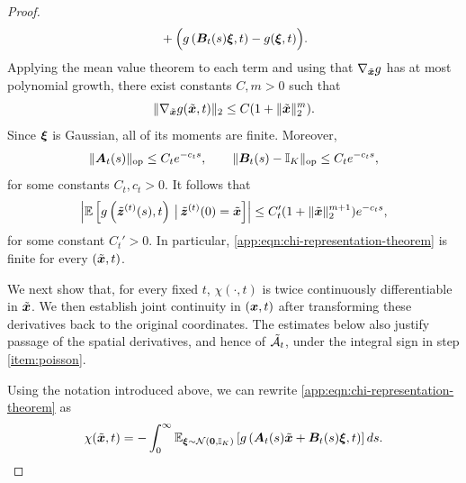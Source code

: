 \begin{proof}
\begin{equation*}
\begin{aligned}
    &\quad + \Big( g\left(\boldsymbol{B}_t(s)\boldsymbol{\xi},t\right)-g(\boldsymbol{\xi},t) \Big).
\end{aligned}
\end{equation*}
Applying the mean value theorem to each term and using that $\nabla_{\tilde{\boldsymbol{x}}} g$ has at most polynomial growth,
there exist constants $C, m > 0$ such that
\begin{equation*}
    \|\nabla_{\tilde{\boldsymbol{x}}} g(\tilde{\boldsymbol{x}},t)\|_2 \le C(1+\|\tilde{\boldsymbol{x}}\|_2^m).
\end{equation*}
Since $\boldsymbol{\xi}$ is Gaussian, all of its moments are finite. Moreover,
\begin{equation*}
    \|\boldsymbol{A}_t(s)\|_{\mathrm{op}} \leq C_t e^{-c_t s}, \qquad \|\boldsymbol{B}_t(s)-\mathbb{I}_K\|_{\mathrm{op}} \leq C_t e^{-c_t s},
\end{equation*}
for some constants $C_t, c_t > 0$. It follows that
\begin{equation*}
    \left| \mathbb{E}\left[g\left(\tilde{\boldsymbol{z}}^{(t)}(s),t\right)\,\big|\,\tilde{\boldsymbol{z}}^{(t)}(0)=\tilde{\boldsymbol{x}}\right] \right| \leq C_t'(1+\|\tilde{\boldsymbol{x}}\|_2^{m+1})e^{-c_t s},
\end{equation*}
for some constant $C_t' > 0$. In particular, \cref{app:eqn:chi-representation-theorem} is finite for every $(\tilde{\boldsymbol{x}}, t)$.

We next show that, for every fixed $t$, $\chi(\cdot,t)$ is twice continuously differentiable in $\tilde{\boldsymbol{x}}$. We then establish joint continuity in $(\boldsymbol{x},t)$ after transforming these derivatives back to the original coordinates. The estimates below also justify passage of the spatial derivatives, and hence of $\tilde{\mathcal{A}}_t$, under the integral sign in step \ref{item:poisson}.

Using the notation introduced above, we can rewrite
\cref{app:eqn:chi-representation-theorem} as
\begin{equation}\label{app:eqn:chi-gaussian-representation-theorem}
    \chi(\tilde{\boldsymbol{x}},t) = -\int_0^\infty \mathbb{E}_{\boldsymbol{\xi} \sim \mathcal{N}(\boldsymbol{0},\mathbb{I}_K)} \left[ g\left(\boldsymbol{A}_t(s)\tilde{\boldsymbol{x}}+\boldsymbol{B}_t(s)\boldsymbol{\xi},t\right) \right] ds.
\end{equation}


\end{proof}
